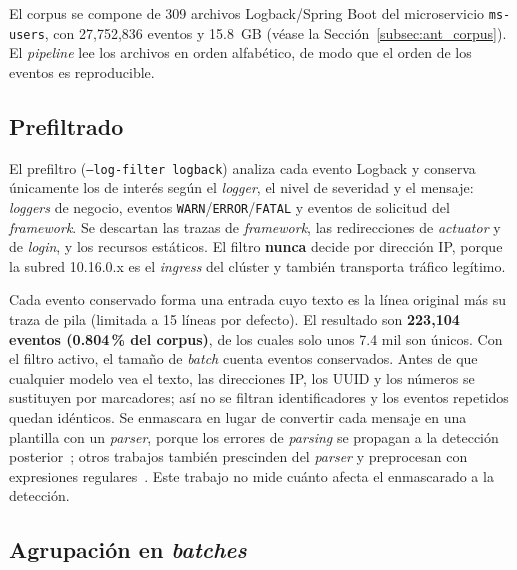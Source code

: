 El corpus se compone de 309 archivos Logback/Spring Boot del microservicio \texttt{ms-users}, con 27{,}752{,}836 eventos y 15.8~GB (véase la Sección~\ref{subsec:ant_corpus}). El \textit{pipeline} lee los archivos en orden alfabético, de modo que el orden de los eventos es reproducible.

\subsection{Prefiltrado}\label{subsec:met_prefiltro}

El prefiltro (\texttt{--log-filter logback}) analiza cada evento Logback y conserva únicamente los de interés según el \textit{logger}, el nivel de severidad y el mensaje: \textit{loggers} de negocio, eventos \texttt{WARN}/\texttt{ERROR}/\texttt{FATAL} y eventos de solicitud del \textit{framework}. Se descartan las trazas de \textit{framework}, las redirecciones de \textit{actuator} y de \textit{login}, y los recursos estáticos. El filtro \textbf{nunca} decide por dirección IP, porque la subred 10.16.0.x es el \textit{ingress} del clúster y también transporta tráfico legítimo.

Cada evento conservado forma una entrada cuyo texto es la línea original más su traza de pila (limitada a 15 líneas por defecto). El resultado son \textbf{223{,}104 eventos (0.804\,\% del corpus)}, de los cuales solo unos 7.4 mil son únicos. Con el filtro activo, el tamaño de \textit{batch} cuenta eventos conservados. Antes de que cualquier modelo vea el texto, las direcciones IP, los UUID y los números se sustituyen por marcadores; así no se filtran identificadores y los eventos repetidos quedan idénticos. Se enmascara en lugar de convertir cada mensaje en una plantilla con un \textit{parser}, porque los errores de \textit{parsing} se propagan a la detección posterior~\cite{sun2026_parsing}; otros trabajos también prescinden del \textit{parser} y preprocesan con expresiones regulares~\cite{guan2024_logllm}. Este trabajo no mide cuánto afecta el enmascarado a la detección. %

\subsection{Agrupación en \textit{batches}}\label{subsec:met_batches}

